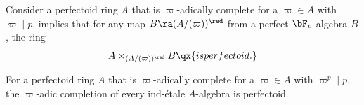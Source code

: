 \epf



\beg \label{eg-glue}
Consider a perfectoid ring $A$ that is $\varpi$-adically complete for a $\varpi \in A$ with $\varpi \mid p$.  implies that for any map $B \ra (A/(\varpi))^\red$ from a perfect  $\bF_p$-algebra $B$, the ring
\[
 A \times_{(A/(\varpi))^\red} B \qx{is perfectoid.}
\]
\eeg





\bcor \label{cor:ind-etale}
For a perfectoid ring $A$ that is $\varpi$-adically complete for a $\varpi \in A$ with $\varpi^p \mid p$, the $\varpi$-adic  completion  of every ind-\'{e}tale $A$-algebra is perfectoid.
\ecor

